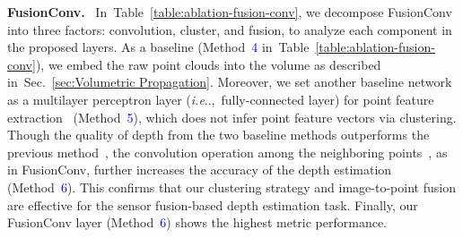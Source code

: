 \documentclass[letterpaper, 10 pt, conference]{ieeeconf}
\makeatletter
\DeclareRobustCommand\onedot{\futurelet\@let@token\@onedot}
\def\@onedot{\ifx\@let@token.\else.\null\fi\xspace}
\def\eg{\emph{e.g}\onedot} \def\Eg{{E.g}\onedot}
\def\ie{\emph{i.e}\onedot} \def\Ie{{I.e}\onedot}
\newcommand{\Tref}[1]{Table~\textcolor{blue}{\ref{#1}}}
\newcommand{\Sref}[1]{Sec.~\textcolor{blue}{\ref{#1}}}
\makeatother
\begin{document}
\begin{table}[!t]
    \centering
    \caption{\textbf{Ablation study of different levels of fusion}. Early fusion takes pre-processing steps to project point clouds into image domain for fusion, while intermediate fusion proposes fusion at feature space, \eg, fusion volume.
    }
    \vspace{-2mm}
    \label{table:ablation-early-fusion}
    \vspace{-6mm}
\end{table}

\noindent \textbf{FusionConv.} \
In~\Tref{table:ablation-fusion-conv}, we decompose FusionConv into three factors: convolution, cluster, and fusion, to analyze each component in the proposed layers. As a baseline (Method~\textcolor{blue}{4} in~\Tref{table:ablation-fusion-conv}), we embed the raw point clouds  into the volume  as described in~\Sref{sec:Volumetric Propagation}. Moreover, we set another baseline network as a multilayer perceptron layer (\ie,~fully-connected layer) for point feature extraction~\cite{pointnet} (Method~\textcolor{blue}{5}), which does not infer point feature vectors  via clustering. Though the quality of depth from the two baseline methods outperforms the previous method~\cite{stereolidar_norm_costV_ccvn}, the convolution operation among the neighboring points~, as in FusionConv, further increases the accuracy of the depth estimation (Method~\textcolor{blue}{6}). This confirms that our clustering strategy and image-to-point fusion are effective for the sensor fusion-based depth estimation task. Finally, our FusionConv layer (Method~\textcolor{blue}{6}) shows the highest metric performance. 
\end{document}
